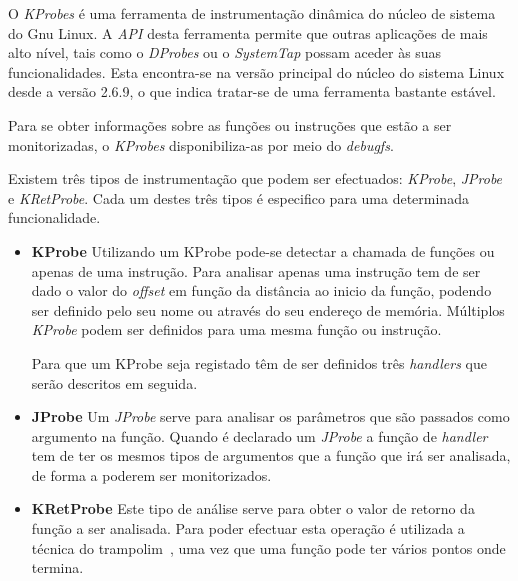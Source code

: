 O \textit{KProbes} é uma ferramenta de instrumentação dinâmica do núcleo de sistema do Gnu Linux.
A \textit{API} desta ferramenta permite que outras aplicações de mais alto nível, tais como o \textit{DProbes} ou o \textit{SystemTap} possam aceder às suas funcionalidades.
Esta encontra-se na versão principal do núcleo do sistema Linux desde a versão 2.6.9, o que indica tratar-se de uma ferramenta bastante estável\cite{kernel_debug_printk_on_fly,KProbesSite}.


Para se obter informações sobre as funções ou instruções que estão a ser monitorizadas, o \textit{KProbes} disponibiliza-as por meio do \textit{debugfs}.

Existem três tipos de instrumentação que podem ser efectuados: \textit{KProbe}, \textit{JProbe} e \textit{KRetProbe}. Cada um destes três tipos é especifico para uma determinada funcionalidade.

\begin{itemize}
 \item \textbf{KProbe}
Utilizando um KProbe pode-se detectar a chamada de funções ou apenas de uma instrução.
Para analisar apenas uma instrução tem de ser dado o valor do \textit{offset} em função da distância ao inicio da função, podendo ser definido pelo seu nome ou através do seu endereço de memória.
Múltiplos \textit{KProbe} podem ser definidos para uma mesma função ou instrução.

Para que um KProbe seja registado têm de ser definidos três \textit{handlers} que serão descritos em seguida.

\item \textbf{JProbe}
Um \textit{JProbe} serve para analisar os parâmetros que são passados como argumento na função.
Quando é declarado um \textit{JProbe} a função de \textit{handler} tem de ter os mesmos tipos de argumentos que a função que irá ser analisada, de forma a poderem ser monitorizados.
 

 \item \textbf{KRetProbe}
  Este tipo de análise serve para obter o valor de retorno da função a ser analisada.
Para poder efectuar esta operação é utilizada a técnica do trampolim~\cite{Hollingsworth94dynamicprogram}, uma vez que uma função pode ter vários pontos onde termina.


\end{itemize}

